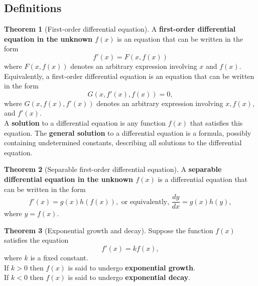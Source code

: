 \documentclass[11pt]{article}
\theoremstyle{definition}
\theoremstyle{named}
\newtheorem*{namedtheorem}{Theorem}
\numberwithin{myalgctr}{section}
\begin{document}
\thispagestyle{fancy}
\subsection*{Definitions}
\begin{namedtheorem}[First-order differential equation] A {\bf first-order differential equation in the unknown $f(x)$} is an equation that can be written in the form
  \[
  f'(x)=F(x,f(x)) \tag{$*$}
  \]
  where $F(x,f(x))$ denotes an arbitrary expression involving $x$ and $f(x)$. Equivalently, a first-order differential equation is an equation that can be written in the form
  \[
  G(x, f'(x), f(x))=0,
  \]
  where $G(x,f(x), f'(x))$ denotes an arbitrary expression involving $x, f(x)$, and $f'(x)$.
\vspace{.1in}
\\
A {\bf solution} to a differential equation is any function $f(x)$ that satisfies this equation. The {\bf general solution} to a differential equation is a formula, possibly containing undetermined constants, describing all solutions to the differential equation.
\end{namedtheorem}
\begin{namedtheorem}[Separable first-order differential equation]A {\bf separable differential equation in the unknown $f(x)$} is a differential equation that can be written in the form
  \[
  f'(x)=g(x)h(f(x)), \text{ or equivalently,  } \frac{dy}{dx}=g(x)h(y),
  \]
  where $y=f(x)$.

\end{namedtheorem}
\begin{namedtheorem}[Exponential growth and decay] Suppose the function $f(x)$ satisfies the equation
  \[
 f'(x)=k f(x),
  \]
  where $k$ is a fixed constant.
  \vspace{.1in}
  \\
  If $k>0$ then $f(x)$ is said to undergo {\bf exponential growth}.
  \vspace{.1in}
  \\
  If $k<0$ then $f(x)$ is said to undergo {\bf exponential decay}.

\end{namedtheorem}



\end{document}
